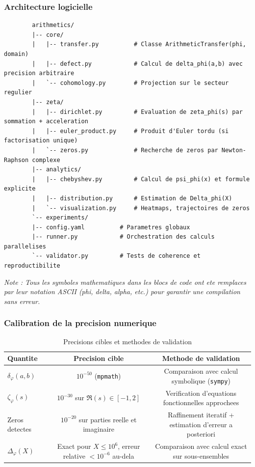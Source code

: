 \documentclass[11pt,a4paper]{article}
\begin{document}
	\subsubsection{Architecture logicielle}
	\begin{verbatim}
		arithmetics/
		|-- core/
		|   |-- transfer.py          # Classe ArithmeticTransfer(phi, domain)
		|   |-- defect.py            # Calcul de delta_phi(a,b) avec precision arbitraire
		|   `-- cohomology.py        # Projection sur le secteur regulier
		|-- zeta/
		|   |-- dirichlet.py         # Evaluation de zeta_phi(s) par sommation + acceleration
		|   |-- euler_product.py     # Produit d'Euler tordu (si factorisation unique)
		|   `-- zeros.py             # Recherche de zeros par Newton-Raphson complexe
		|-- analytics/
		|   |-- chebyshev.py         # Calcul de psi_phi(x) et formule explicite
		|   |-- distribution.py      # Estimation de Delta_phi(X)
		|   `-- visualization.py     # Heatmaps, trajectoires de zeros
		`-- experiments/
		|-- config.yaml          # Parametres globaux
		|-- runner.py            # Orchestration des calculs parallelises
		`-- validator.py         # Tests de coherence et reproductibilite
	\end{verbatim}
	\textit{Note : Tous les symboles mathematiques dans les blocs de code ont ete remplaces par leur notation ASCII (phi, delta, alpha, etc.) pour garantir une compilation sans erreur.}
	
	\subsubsection{Calibration de la precision numerique}
	\begin{table}[ht]
		\centering
		\caption{Precisions cibles et methodes de validation}
		\label{tab:precision}
		\begin{tabular}{lcc}
			\toprule
			\textbf{Quantite} & \textbf{Precision cible} & \textbf{Methode de validation} \\
			\midrule
			$\delta_\varphi(a,b)$ & $10^{-50}$ (\texttt{mpmath}) & Comparaison avec calcul symbolique (\texttt{sympy}) \\
			$\zeta_\varphi(s)$ & $10^{-30}$ sur $\Re(s)\in[-1,2]$ & Verification d'equations fonctionnelles approchees \\
			Zeros detectes & $10^{-20}$ sur parties reelle et imaginaire & Raffinement iteratif + estimation d'erreur a posteriori \\
			$\Delta_\varphi(X)$ & Exact pour $X\leq 10^6$, erreur relative $<10^{-6}$ au-dela & Comparaison avec calcul exact sur sous-ensembles \\
			\bottomrule
		\end{tabular}
	\end{table}
	
\end{document}
